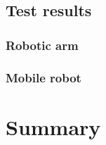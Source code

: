 \documentclass[printmode,en]{mgr}
\begin{document}
\section{Test results}

\subsection{Robotic arm}

\subsection{Mobile robot}


\chapter{Summary}
\appendix




\end{document}
